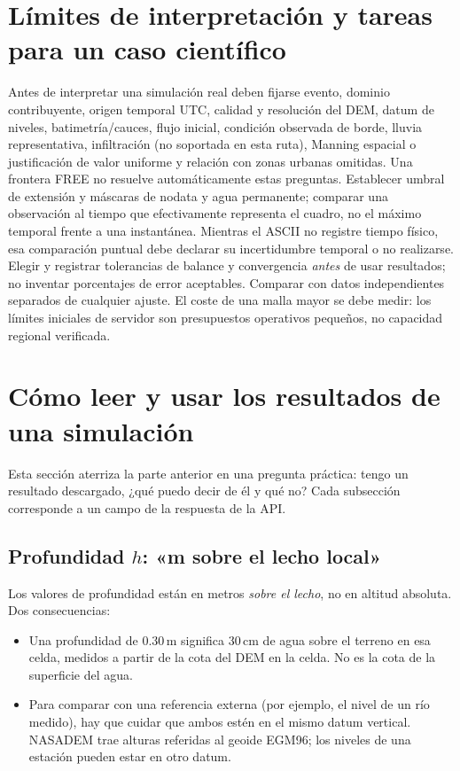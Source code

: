 \documentclass[11pt,a4paper]{article}
\begin{document}
\section{Límites de interpretación y tareas para un caso científico}
\label{sec:limites}
Antes de interpretar una simulación real deben fijarse evento, dominio contribuyente, origen temporal UTC, calidad y resolución del DEM, datum de niveles, batimetría/cauces, flujo inicial, condición observada de borde, lluvia representativa, infiltración (no soportada en esta ruta), Manning espacial o justificación de valor uniforme y relación con zonas urbanas omitidas. Una frontera FREE no resuelve automáticamente estas preguntas. Establecer umbral de extensión y máscaras de nodata y agua permanente; comparar una observación al tiempo que efectivamente representa el cuadro, no el máximo temporal frente a una instantánea. Mientras el ASCII no registre tiempo físico, esa comparación puntual debe declarar su incertidumbre temporal o no realizarse. Elegir y registrar tolerancias de balance y convergencia \emph{antes} de usar resultados; no inventar porcentajes de error aceptables. Comparar con datos independientes separados de cualquier ajuste. El coste de una malla mayor se debe medir: los límites iniciales de servidor son presupuestos operativos pequeños, no capacidad regional verificada.

\section{Cómo leer y usar los resultados de una simulación}
\label{sec:leer-resultados}

Esta sección aterriza la parte anterior en una pregunta práctica: tengo un resultado descargado, ¿qué puedo
decir de él y qué no? Cada subsección corresponde a un campo de la respuesta de la API.

\subsection{Profundidad $h$: «m sobre el lecho local»}

Los valores de profundidad están en metros \emph{sobre el lecho}, no en altitud absoluta. Dos consecuencias:
\begin{itemize}
  \item Una profundidad de $0.30$\,m significa 30\,cm de agua sobre el terreno en esa celda, medidos a partir de
        la cota del DEM en la celda. No es la cota de la superficie del agua.
  \item Para comparar con una referencia externa (por ejemplo, el nivel de un río medido), hay que cuidar que
        ambos estén en el mismo datum vertical. NASADEM trae alturas referidas al geoide EGM96; los niveles de
        una estación pueden estar en otro datum.
\end{itemize}
\end{document}
